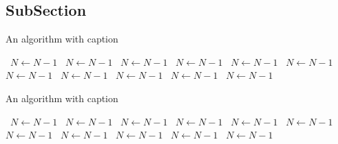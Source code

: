 \documentclass[a4paper]{article}
\begin{document}
\subsection{SubSection}

\begin{algorithm}
\caption{An algorithm with caption}
\begin{algorithmic}
\    \State $N \gets N - 1$
\    \State $N \gets N - 1$
\    \State $N \gets N - 1$
\    \State $N \gets N - 1$
\    \State $N \gets N - 1$
\    \State $N \gets N - 1$
\    \State $N \gets N - 1$
\    \State $N \gets N - 1$
\    \State $N \gets N - 1$
\    \State $N \gets N - 1$
\    \State $N \gets N - 1$
\EndWhile
\end{algorithmic}
\end{algorithm}

\begin{algorithm}
\caption{An algorithm with caption}
\begin{algorithmic}
\    \State $N \gets N - 1$
\    \State $N \gets N - 1$
\    \State $N \gets N - 1$
\    \State $N \gets N - 1$
\    \State $N \gets N - 1$
\    \State $N \gets N - 1$
\    \State $N \gets N - 1$
\    \State $N \gets N - 1$
\    \State $N \gets N - 1$
\    \State $N \gets N - 1$
\    \State $N \gets N - 1$
\EndWhile
\end{algorithmic}
\end{algorithm}
\end{document}
